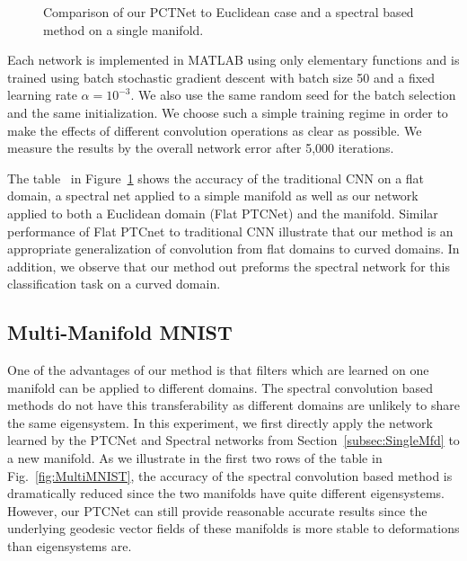 \documentclass[10pt,twocolumn,letterpaper]{article}
\begin{document}
\begin{figure}[htp]
\begin{center}
\end{center}
\caption{Comparison of our PCTNet to Euclidean case and a spectral based method on a single manifold.}
\label{tab:SingleMNIST}
\end{figure}

Each network is implemented in MATLAB using only elementary functions and  is trained using batch stochastic gradient descent with batch size 50 and a fixed learning rate $\alpha = 10^{-3}$. We also use the same random seed for the batch selection and the same initialization. We choose such a simple training regime in order to make the effects of different convolution operations as clear as possible. We measure the results by the overall network error after 5,000 iterations.

The table~ in Figure~\ref{tab:SingleMNIST} shows the accuracy of the traditional CNN on a flat domain, a spectral net applied to a simple manifold as well as our network applied to both a Euclidean domain (Flat PTCNet) and the manifold. Similar performance of Flat PTCnet to traditional CNN illustrate that our method is an appropriate generalization of convolution from flat domains to curved domains. In addition, we observe that our method out preforms the spectral network for this classification task on a curved domain.

\subsection{Multi-Manifold MNIST}
One of the advantages of our method is that filters which are learned on one manifold can be applied to different domains. The spectral convolution based methods do not have this transferability as different domains are unlikely to share the same eigensystem. In this experiment, we first directly apply the network learned by the PTCNet and Spectral networks from Section~\ref{subsec:SingleMfd} to a new manifold. As we illustrate in the first two rows of the table in Fig.~\ref{fig:MultiMNIST}, the accuracy of the spectral convolution based method is dramatically reduced since the two manifolds have quite different eigensystems. However, our PTCNet can still provide reasonable accurate results since the underlying geodesic vector fields of these manifolds is more stable to deformations than eigensystems are.
\end{document}

